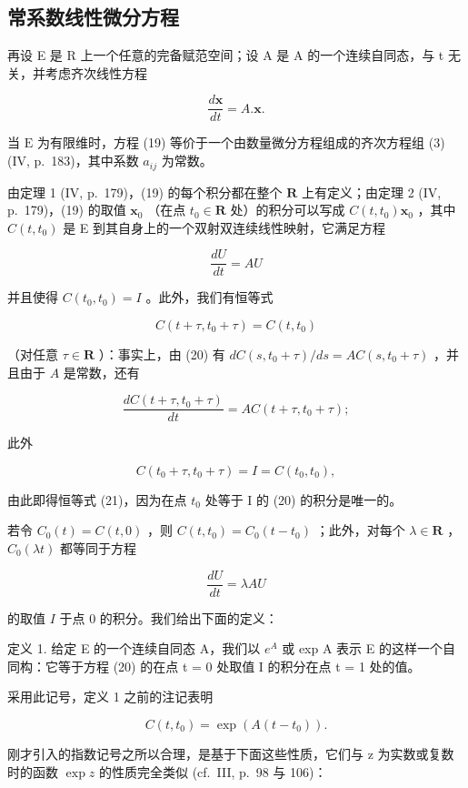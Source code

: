 \subsection{常系数线性微分方程}

再设 E 是 R 上一个任意的完备赋范空间；设 A 是 A 的一个连续自同态，与 t 无关，并考虑齐次线性方程

\[
{\frac {d \mathbf {x}}{d t}} = A. \mathbf {x}.\tag{19}
\]

当 \(\mathrm{E}\) 为有限维时，方程 (19) 等价于一个由数量微分方程组成的齐次方程组 (3) (IV, p.~183)，其中系数 \(a_{ij}\) 为常数。

由定理 1 (IV, p.~179)，(19) 的每个积分都在整个 \(\mathbf{R}\) 上有定义；由定理 2 (IV, p.~179)，(19) 的取值 \(\mathbf{x}_0\) （在点 \(t_0 \in \mathbf{R}\) 处）的积分可以写成 \(C(t, t_0)\mathbf{x}_0\) ，其中 \(C(t, t_0)\) 是 E 到其自身上的一个双射双连续线性映射，它满足方程

\[
\frac {d U}{d t} = A U\tag{20}
\]

并且使得 \(C(t_0, t_0) = I\) 。此外，我们有恒等式

\[
C (t + \tau , t _ {0} + \tau) = C (t, t _ {0})\tag{21}
\]

（对任意 \(\tau \in \mathbf{R}\) ）：事实上，由 (20) 有 \(dC(s, t_0 + \tau) / ds = AC(s, t_0 + \tau)\) ，并且由于 \(A\) 是常数，还有

\[
\frac {d C (t + \tau , t _ {0} + \tau)}{d t} = A C (t + \tau , t _ {0} + \tau);
\]

此外

\[
C (t _ {0} + \tau , t _ {0} + \tau) = I = C (t _ {0}, t _ {0}),
\]

由此即得恒等式 (21)，因为在点 \(t_{0}\) 处等于 I 的 (20) 的积分是唯一的。

若令 \(C_0(t) = C(t, 0)\) ，则 \(C(t, t_0) = C_0(t - t_0)\) ；此外，对每个 \(\lambda \in \mathbf{R}\) ，\(C_0(\lambda t)\) 都等同于方程

\[
\frac {d U}{d t} = \lambda A U\tag{22}
\]

的取值 \(I\) 于点 0 的积分。我们给出下面的定义：

定义 1. 给定 E 的一个连续自同态 A，我们以 \(e^{A}\) 或 exp A 表示 E 的这样一个自同构：它等于方程 (20) 的在点 t = 0 处取值 I 的积分在点 t = 1 处的值。

采用此记号，定义 1 之前的注记表明

\[
C (t, t _ {0}) = \exp \left(A (t - t _ {0})\right).\tag{23}
\]

刚才引入的指数记号之所以合理，是基于下面这些性质，它们与 z 为实数或复数时的函数 \(\exp z\) 的性质完全类似 (cf.~III, p.~98 与 106)：


